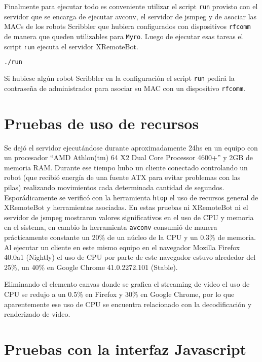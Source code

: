 Finalmente para ejecutar todo es conveniente utilizar el script
\texttt{run} provisto con el servidor que se encarga de ejecutar
avconv, el servidor de jsmpeg y de asociar las MACs de los
robots Scribbler que hubiera configurados con dispositivos
\texttt{rfcomm} de manera que queden utilizables para \texttt{Myro}.
Luego de ejecutar esas tareas el script \texttt{run} ejecuta
el servidor XRemoteBot.

\begin{lstlisting}[language=bash,
caption={Ejecutar el servidor y procesos asociados},
label=lst:ejecutar_xremotebot]
./run
\end{lstlisting}

Si hubiese algún robot Scribbler en la configuración el script
\texttt{run} pedirá la contraseña de administrador para asociar
su MAC con un dispositivo \texttt{rfcomm}.

\section{Pruebas de uso de recursos}
Se dejó el servidor ejecutándose durante aproximadamente 24hs en
un equipo con un procesador
``AMD Athlon(tm) 64 X2 Dual Core Processor 4600+'' y 2GB de memoria
RAM. Durante ese tiempo hubo un cliente conectado controlando
un robot (que recibió energía de una fuente ATX para evitar problemas
con las pilas) realizando movimientos cada determinada cantidad de
segundos. Esporádicamente se verificó con la herramienta
\texttt{htop} el uso de recursos general de XRemoteBot y herramientas
asociadas. En estas pruebas ni XRemoteBot ni el servidor de jsmpeg
mostraron valores significativos en el uso de CPU y memoria en
el sistema, en cambio la herramienta \texttt{avconv} consumió
de manera prácticamente constante un 20\% de un núcleo de la CPU
y un 0.3\% de memoria. Al ejecutar un cliente en este mismo
equipo en el navegador Mozilla Firefox 40.0a1 (Nightly)
el uso de CPU por parte de este navegador estuvo alrededor
del 25\%, un 40\% en Google Chrome 41.0.2272.101 (Stable).

Eliminando el elemento canvas donde se grafica el streaming de video
el uso de CPU se redujo a un 0.5\% en Firefox y 30\% en Google Chrome,
por lo que aparentemente ese uso de CPU se encuentra relacionado
con la decodificación y renderizado de video.

\section{Pruebas con la interfaz Javascript}

